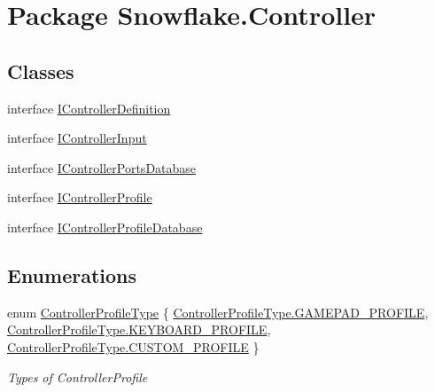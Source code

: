 \hypertarget{namespace_snowflake_1_1_controller}{}\section{Package Snowflake.\+Controller}
\label{namespace_snowflake_1_1_controller}
\subsection*{Classes}
\begin{DoxyCompactItemize}
\item 
interface \hyperlink{interface_snowflake_1_1_controller_1_1_i_controller_definition}{I\+Controller\+Definition}
\item 
interface \hyperlink{interface_snowflake_1_1_controller_1_1_i_controller_input}{I\+Controller\+Input}
\item 
interface \hyperlink{interface_snowflake_1_1_controller_1_1_i_controller_ports_database}{I\+Controller\+Ports\+Database}
\item 
interface \hyperlink{interface_snowflake_1_1_controller_1_1_i_controller_profile}{I\+Controller\+Profile}
\item 
interface \hyperlink{interface_snowflake_1_1_controller_1_1_i_controller_profile_database}{I\+Controller\+Profile\+Database}
\end{DoxyCompactItemize}
\subsection*{Enumerations}
\begin{DoxyCompactItemize}
\item 
enum \hyperlink{namespace_snowflake_1_1_controller_af6896d98053b4f8f2d42c32c6fb05c96}{Controller\+Profile\+Type} \{ \hyperlink{namespace_snowflake_1_1_controller_af6896d98053b4f8f2d42c32c6fb05c96ae9f241ed90f10d7d5bd2db821e559948}{Controller\+Profile\+Type.\+G\+A\+M\+E\+P\+A\+D\+\_\+\+P\+R\+O\+F\+I\+L\+E}, 
\hyperlink{namespace_snowflake_1_1_controller_af6896d98053b4f8f2d42c32c6fb05c96ab8fca83ec4dcb034a3c1a31285bbc432}{Controller\+Profile\+Type.\+K\+E\+Y\+B\+O\+A\+R\+D\+\_\+\+P\+R\+O\+F\+I\+L\+E}, 
\hyperlink{namespace_snowflake_1_1_controller_af6896d98053b4f8f2d42c32c6fb05c96abb8d1b08d5f2d8121aa2d1f026297293}{Controller\+Profile\+Type.\+C\+U\+S\+T\+O\+M\+\_\+\+P\+R\+O\+F\+I\+L\+E}
 \}
\begin{DoxyCompactList}\small\item\em Types of Controller\+Profile \end{DoxyCompactList}\end{DoxyCompactItemize}


